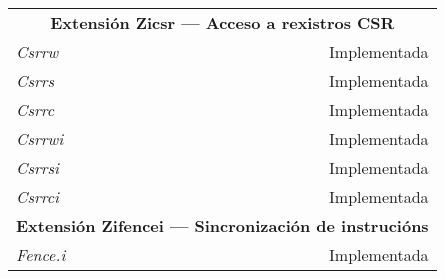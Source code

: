 \begin{longtable}{l|r}
    \multicolumn{2}{c}{\textbf{Extensión Zicsr — Acceso a rexistros CSR}} \\
    \textit{Csrrw} & Implementada \\
    \textit{Csrrs} & Implementada \\
    \textit{Csrrc} & Implementada \\
    \textit{Csrrwi} & Implementada \\
    \textit{Csrrsi} & Implementada \\
    \textit{Csrrci} & Implementada \\

    \multicolumn{2}{c}{\textbf{Extensión Zifencei — Sincronización de instrucións}} \\
    \textit{Fence.i} & Implementada \\
\end{longtable}
